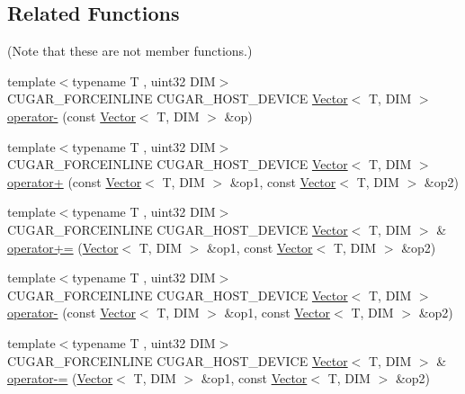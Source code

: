 \subsection*{Related Functions}
(Note that these are not member functions.) \begin{DoxyCompactItemize}
\item 
{\footnotesize template$<$typename T , uint32 D\+IM$>$ }\\C\+U\+G\+A\+R\+\_\+\+F\+O\+R\+C\+E\+I\+N\+L\+I\+NE C\+U\+G\+A\+R\+\_\+\+H\+O\+S\+T\+\_\+\+D\+E\+V\+I\+CE \hyperlink{structcugar_1_1_vector}{Vector}$<$ T, D\+IM $>$ \hyperlink{group___vectors_module_ga79019254703773ad3d352a503d3d820a}{operator-\/} (const \hyperlink{structcugar_1_1_vector}{Vector}$<$ T, D\+IM $>$ \&op)
\item 
{\footnotesize template$<$typename T , uint32 D\+IM$>$ }\\C\+U\+G\+A\+R\+\_\+\+F\+O\+R\+C\+E\+I\+N\+L\+I\+NE C\+U\+G\+A\+R\+\_\+\+H\+O\+S\+T\+\_\+\+D\+E\+V\+I\+CE \hyperlink{structcugar_1_1_vector}{Vector}$<$ T, D\+IM $>$ \hyperlink{group___vectors_module_ga489fb43a70bf29d1770cfe886bc225f2}{operator+} (const \hyperlink{structcugar_1_1_vector}{Vector}$<$ T, D\+IM $>$ \&op1, const \hyperlink{structcugar_1_1_vector}{Vector}$<$ T, D\+IM $>$ \&op2)
\item 
{\footnotesize template$<$typename T , uint32 D\+IM$>$ }\\C\+U\+G\+A\+R\+\_\+\+F\+O\+R\+C\+E\+I\+N\+L\+I\+NE C\+U\+G\+A\+R\+\_\+\+H\+O\+S\+T\+\_\+\+D\+E\+V\+I\+CE \hyperlink{structcugar_1_1_vector}{Vector}$<$ T, D\+IM $>$ \& \hyperlink{group___vectors_module_gab459e58fcb21396fafa8f4a2d562a8e1}{operator+=} (\hyperlink{structcugar_1_1_vector}{Vector}$<$ T, D\+IM $>$ \&op1, const \hyperlink{structcugar_1_1_vector}{Vector}$<$ T, D\+IM $>$ \&op2)
\item 
{\footnotesize template$<$typename T , uint32 D\+IM$>$ }\\C\+U\+G\+A\+R\+\_\+\+F\+O\+R\+C\+E\+I\+N\+L\+I\+NE C\+U\+G\+A\+R\+\_\+\+H\+O\+S\+T\+\_\+\+D\+E\+V\+I\+CE \hyperlink{structcugar_1_1_vector}{Vector}$<$ T, D\+IM $>$ \hyperlink{group___vectors_module_ga0e674f7f0f36bd82e3fec0c821114d67}{operator-\/} (const \hyperlink{structcugar_1_1_vector}{Vector}$<$ T, D\+IM $>$ \&op1, const \hyperlink{structcugar_1_1_vector}{Vector}$<$ T, D\+IM $>$ \&op2)
\item 
{\footnotesize template$<$typename T , uint32 D\+IM$>$ }\\C\+U\+G\+A\+R\+\_\+\+F\+O\+R\+C\+E\+I\+N\+L\+I\+NE C\+U\+G\+A\+R\+\_\+\+H\+O\+S\+T\+\_\+\+D\+E\+V\+I\+CE \hyperlink{structcugar_1_1_vector}{Vector}$<$ T, D\+IM $>$ \& \hyperlink{group___vectors_module_ga91cd021cf4fdca7eb4036efe1ea0798c}{operator-\/=} (\hyperlink{structcugar_1_1_vector}{Vector}$<$ T, D\+IM $>$ \&op1, const \hyperlink{structcugar_1_1_vector}{Vector}$<$ T, D\+IM $>$ \&op2)

\end{DoxyCompactItemize}
